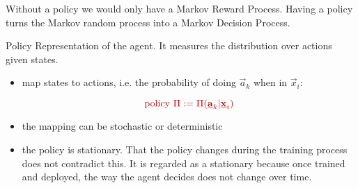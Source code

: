 \begin{frame}

Without a policy we would only have a Markov Reward Process.
Having a policy turns the Markov random process into a Markov Decision Process.

\begin{block}{\textcolor{policy}{Policy}}
Representation of the agent. It measures the distribution over actions given states.
\begin{itemize}
\item map states to actions, i.e. the probability of doing $\vec a_k$ when in $\vec x_i$:

\begin{equation}
\color{policy}
\text{policy }\Pi := \Pi(\vec a_k | \vec x_i)
\end{equation}
\item the mapping can be stochastic or deterministic
\item the policy is stationary. That the policy changes during the training process does not contradict this.
It is regarded as a stationary because once trained and deployed, the way the agent decides does not change over time.
\end{itemize}

\end{block}

\end{frame}

